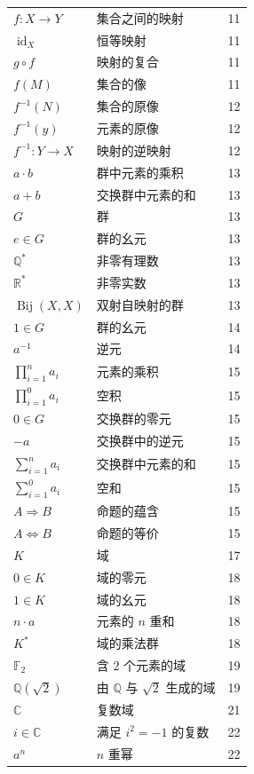 \begin{longtable}{@{}l l r}
$f \colon X \longrightarrow Y$ & 集合之间的映射 & 11 \\
$\operatorname{id}_X$ & 恒等映射 & 11 \\
$g \circ f$ & 映射的复合 & 11 \\
$f(M)$ & 集合的像 & 11 \\
$f^{-1}(N)$ & 集合的原像 & 12 \\
$f^{-1}(y)$ & 元素的原像 & 12 \\
$f^{-1} \colon Y \longrightarrow X$ & 映射的逆映射 & 12 \\
$a \cdot b$ & 群中元素的乘积 & 13 \\
$a + b$ & 交换群中元素的和 & 13 \\
$G$ & 群 & 13 \\
$e \in G$ & 群的幺元 & 13 \\
$\mathbb{Q}^*$ & 非零有理数 & 13 \\
$\mathbb{R}^*$ & 非零实数 & 13 \\
$\operatorname{Bij}(X, X)$ & 双射自映射的群 & 13 \\
$1 \in G$ & 群的幺元 & 14 \\
$a^{-1}$ & 逆元 & 14 \\
$\prod_{i = 1}^{n} a_i$ & 元素的乘积 & 15 \\
$\prod_{i = 1}^{0} a_i$ & 空积 & 15 \\
$0 \in G$ & 交换群的零元 & 15 \\
$-a$ & 交换群中的逆元 & 15 \\
$\sum_{i = 1}^{n} a_i$ & 交换群中元素的和 & 15 \\
$\sum_{i = 1}^{0} a_i$ & 空和 & 15 \\
$A \Longrightarrow B$ & 命题的蕴含 & 15 \\
$A \Longleftrightarrow B$ & 命题的等价 & 15 \\
$K$ & 域 & 17 \\
$0 \in K$ & 域的零元 & 18 \\
$1 \in K$ & 域的幺元 & 18 \\
$n \cdot a$ & 元素的 $n$ 重和 & 18 \\
$K^*$ & 域的乘法群 & 18 \\
$\mathbb{F}_2$ & 含 $2$ 个元素的域 & 19 \\
$\mathbb{Q}(\sqrt{2})$ & 由 $\mathbb{Q}$ 与 $\sqrt{2}$ 生成的域 & 19 \\
$\mathbb{C}$ & 复数域 & 21 \\
$i \in \mathbb{C}$ & 满足 $i^2 = -1$ 的复数 & 22 \\
$a^n$ & $n$ 重幂 & 22 \\

\end{longtable}
